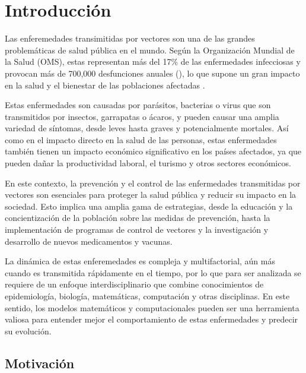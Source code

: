 \chapter*{Introducción}\label{chapter:introduction}

Las enferemedades transimitidas por vectores son una de 
las grandes problemáticas de salud pública en el mundo.
Según la Organización Mundial de la Salud (OMS),
estas representan más del 17\% de las enfermedades infecciosas
y provocan más de 700,000 desfunciones anuales (\cite{who_website2024}),
lo que supone un gran impacto en la salud y el bienestar
de las poblaciones afectadas .
\par
Estas enfermedades son causadas por parásitos,
bacterias o virus que son transmitidos por insectos,
garrapatas o ácaros, y pueden causar una amplia variedad
de síntomas, desde leves hasta graves y potencialmente
mortales. As\'i como en el impacto directo en la salud de
las personas, estas enfermedades también tienen un
impacto económico significativo en los países afectados,
ya que pueden dañar la productividad laboral,
el turismo y otros sectores económicos.
\par
En este contexto, la prevención y el control de las
enfermedades transmitidas por vectores son esenciales
para proteger la salud pública y reducir su impacto
en la sociedad. Esto implica una amplia gama de
estrategias, desde la educación y la concientización
de la población sobre las medidas de prevención,
hasta la implementación de programas de control
de vectores y la investigación y desarrollo de nuevos
medicamentos y vacunas.
\par
La din\'amica de estas enferemedades es compleja y
multifactorial, a\'un m\'as cuando es transmitida r\'apidamente en el tiempo, por lo que
para ser analizada se requiere de un enfoque interdisciplinario que
combine conocimientos de epidemiología,
biología, matemáticas, computaci\'on y otras disciplinas.
En este sentido, los modelos matemáticos y computacionales 
pueden ser una herramienta valiosa para entender mejor
el comportamiento de estas enfermedades y predecir su
evolución.


\section{Motivaci\'on}

